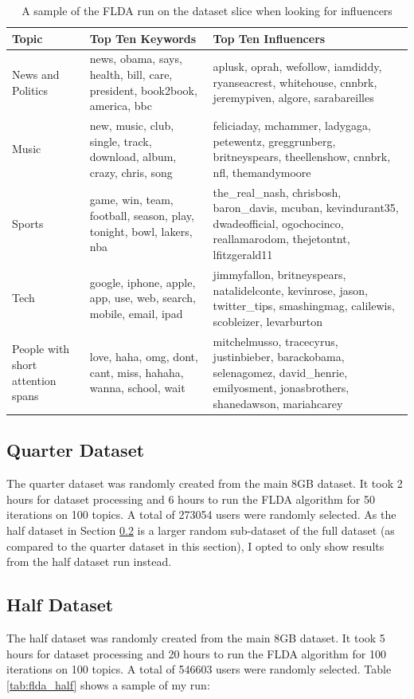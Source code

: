 \documentclass[a4paper]{article}
\begin{document}
\begin{table}[h]
  \centering %
  \begin{tabular}{ |L{5cm}|L{5cm}|L{5cm}| }
    \hline
    Topic & Top Ten Keywords & Top Ten Influencers \\
    \hline
    \hline
    News and Politics & news, obama, says, health, bill, care, president, book2book, america, bbc & aplusk, oprah, wefollow, iamdiddy, ryanseacrest, whitehouse, cnnbrk, jeremypiven, algore, sarabareilles \\
    \hline
    Music & new, music, club, single, track, download, album, crazy, chris, song & feliciaday, mchammer, ladygaga, petewentz, greggrunberg, britneyspears, theellenshow, cnnbrk, nfl, themandymoore \\
    \hline
    Sports & game, win, team, football, season, play, tonight, bowl, lakers, nba & the\_real\_nash, chrisbosh, baron\_davis, mcuban, kevindurant35, dwadeofficial, ogochocinco, reallamarodom, thejetontnt, lfitzgerald11 \\
    \hline
    Tech & google, iphone, apple, app, use, web, search, mobile, email, ipad & jimmyfallon, britneyspears, natalidelconte, kevinrose, jason, twitter\_tips, smashingmag, calilewis, scobleizer, levarburton \\
    \hline
    People with short attention spans & love, haha, omg, dont, cant, miss, hahaha, wanna, school, wait & mitchelmusso, tracecyrus, justinbieber, barackobama, selenagomez, david\_henrie, emilyosment, jonasbrothers, shanedawson, mariahcarey \\
    \hline
  \end{tabular}
  \caption{A sample of the FLDA run on the dataset slice when looking for influencers}
  \label{tab:flda_test}
\end{table}

\subsection{Quarter Dataset}\label{sec:quarter}
The quarter dataset was randomly created from the main 8GB dataset. It took 2 hours for dataset processing and 6 hours to run the FLDA algorithm for 50 iterations on 100 topics. A total of 273054 users were randomly selected. As the half dataset in Section \ref{sec:half} is a larger random sub-dataset of the full dataset (as compared to the quarter dataset in this section), I opted to only show results from the half dataset run instead.

\subsection{Half Dataset}\label{sec:half}
The half dataset was randomly created from the main 8GB dataset. It took 5 hours for dataset processing and 20 hours to run the FLDA algorithm for 100 iterations on 100 topics. A total of 546603 users were randomly selected. Table \ref{tab:flda_half} shows a sample of my run:
\end{document}
